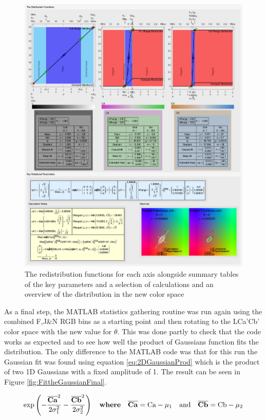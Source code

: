 \begin{figure}[h!]
  \centering
  \includegraphics[width=1.0 \textwidth]{Chapter3/Figs/Distribution_Results.jpg} 
    \caption{ The redistribution functions for each axis alongside summary tables of the key parameters and a selection of calculations and an overview of the distribution in the new color space  }  \label{fig:DistributionResults}
\end{figure}

As a final step, the MATLAB statistics gathering routine was run again using the combined F,J\&N RGB bins as a starting point and then rotating to the LCa'Cb' color space with the new value for $\theta$. This was done partly to check that the code works as expected and to see how well the product of Gaussians function fits the distribution. The only difference to the MATLAB code was that for this run the Gaussian fit was found using equation \ref{eq:2DGaussianProd} which is the product of two 1D Gaussians with a fixed amplitude of 1. The result can be seen in Figure \ref{fig:FittheGaussianFinal}. 

\begin{equation}\label{eq:2DGaussianProd}
\exp \left( -\frac{{\overline{\mathbf{Ca}}}^2}{2 \sigma_1^2} -  \frac{ { \overline{\mathbf{Cb}} }^2}{2 \sigma_2^2} \right) \quad \textbf{where} \quad \overline{\mathbf{Ca}} = \text{Ca}-\mu_1 \quad \text{and} \quad \overline{\mathbf{Cb}} = \text{Cb}-\mu_2 
\end{equation}



